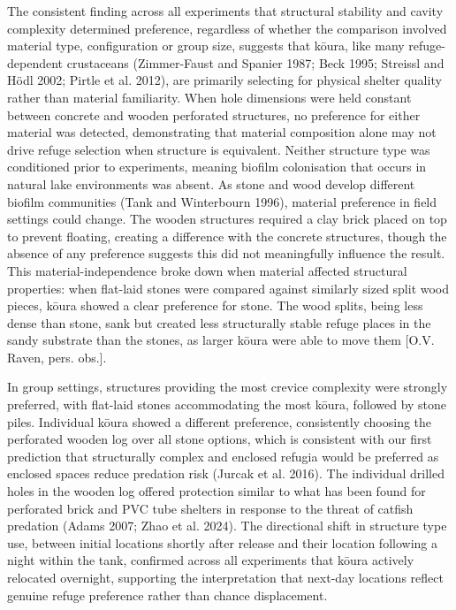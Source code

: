 \documentclass[
  12pt,
  a4paper,
  oneside]{scrbook}
\begin{document}
The consistent finding across all experiments that structural stability
and cavity complexity determined preference, regardless of whether the
comparison involved material type, configuration or group size, suggests
that kōura, like many refuge-dependent crustaceans (Zimmer-Faust and
Spanier 1987; Beck 1995; Streissl and Hödl 2002; Pirtle et al. 2012),
are primarily selecting for physical shelter quality rather than
material familiarity. When hole dimensions were held constant between
concrete and wooden perforated structures, no preference for either
material was detected, demonstrating that material composition alone may
not drive refuge selection when structure is equivalent. Neither
structure type was conditioned prior to experiments, meaning biofilm
colonisation that occurs in natural lake environments was absent. As
stone and wood develop different biofilm communities (Tank and
Winterbourn 1996), material preference in field settings could change.
The wooden structures required a clay brick placed on top to prevent
floating, creating a difference with the concrete structures, though the
absence of any preference suggests this did not meaningfully influence
the result. This material-independence broke down when material affected
structural properties: when flat-laid stones were compared against
similarly sized split wood pieces, kōura showed a clear preference for
stone. The wood splits, being less dense than stone, sank but created
less structurally stable refuge places in the sandy substrate than the
stones, as larger kōura were able to move them {[}O.V. Raven, pers.
obs.{]}.

In group settings, structures providing the most crevice complexity were
strongly preferred, with flat-laid stones accommodating the most kōura,
followed by stone piles. Individual kōura showed a different preference,
consistently choosing the perforated wooden log over all stone options,
which is consistent with our first prediction that structurally complex
and enclosed refugia would be preferred as enclosed spaces reduce
predation risk (Jurcak et al. 2016). The individual drilled holes in the
wooden log offered protection similar to what has been found for
perforated brick and PVC tube shelters in response to the threat of
catfish predation (Adams 2007; Zhao et al. 2024). The directional shift
in structure type use, between initial locations shortly after release
and their location following a night within the tank, confirmed across
all experiments that kōura actively relocated overnight, supporting the
interpretation that next-day locations reflect genuine refuge preference
rather than chance displacement.
\end{document}
